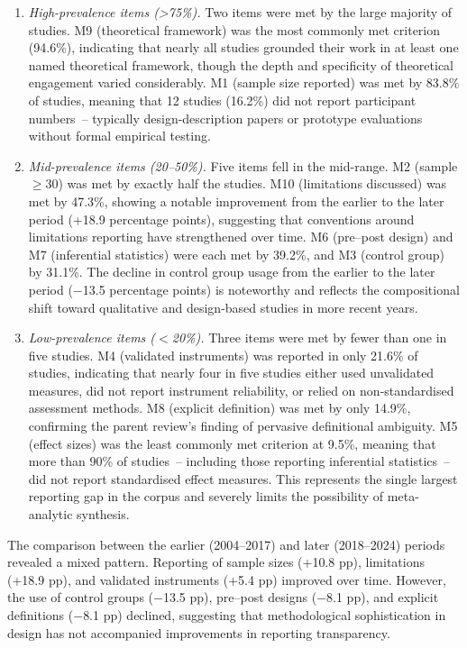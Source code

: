 \documentclass[etq]{acnsart}
\begin{document}
	\begin{enumerate}
		\item 
		\textit{High-prevalence items (>75\%).} Two items were met by the large majority of studies. M9 (theoretical framework) was the most commonly met criterion (94.6\%), indicating that nearly all studies grounded their work in at least one named theoretical framework, though the depth and specificity of theoretical engagement varied considerably. M1 (sample size reported) was met by 83.8\% of studies, meaning that 12 studies (16.2\%) did not report participant numbers~-- typically design-description papers or prototype evaluations without formal empirical testing.
		
		\item 
		\textit{Mid-prevalence items (20--50\%).} Five items fell in the mid-range. M2 (sample $\geq 30$) was met by exactly half the studies. M10 (limitations discussed) was met by 47.3\%, showing a notable improvement from the earlier to the later period (+18.9 percentage points), suggesting that conventions around limitations reporting have strengthened over time. M6 (pre--post design) and M7 (inferential statistics) were each met by 39.2\%, and M3 (control group) by 31.1\%. The decline in control group usage from the earlier to the later period ($-$13.5 percentage points) is noteworthy and reflects the compositional shift toward qualitative and design-based studies in more recent years.
		
		\item 
		\textit{Low-prevalence items ($<$20\%).} Three items were met by fewer than one in five studies. M4 (validated instruments) was reported in only 21.6\% of studies, indicating that nearly four in five studies either used unvalidated measures, did not report instrument reliability, or relied on non-standardised assessment methods. M8 (explicit definition) was met by only 14.9\%, confirming the parent review's finding of pervasive definitional ambiguity. M5 (effect sizes) was the least commonly met criterion at 9.5\%, meaning that more than 90\% of studies~-- including those reporting inferential statistics~-- did not report standardised effect measures. This represents the single largest reporting gap in the corpus and severely limits the possibility of meta-analytic synthesis.
	\end{enumerate}
	
	The comparison between the earlier (2004--2017) and later (2018--2024) periods revealed a mixed pattern. Reporting of sample sizes (+10.8 pp), limitations (+18.9 pp), and validated instruments (+5.4 pp) improved over time. However, the use of control groups ($-$13.5 pp), pre--post designs ($-$8.1 pp), and explicit definitions ($-$8.1 pp) declined, suggesting that methodological sophistication in design has not accompanied improvements in reporting transparency.
	
\end{document}
